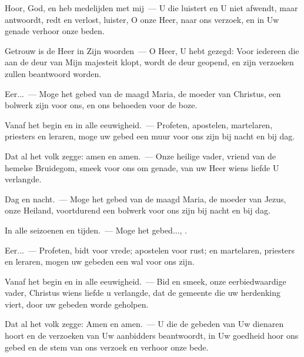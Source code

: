 \documentclass[12pt,twoside,a5paper]{article}
\begin{document}

\begin{halfparskip}
  Hoor, God, en heb medelijden met mij~--- U die luistert en U niet afwendt, maar antwoordt, redt en verlost, luister, O onze Heer, naar ons verzoek, en in Uw genade verhoor onze beden.

  Getrouw is de Heer in Zijn woorden~--- O Heer, U hebt gezegd: Voor iedereen die aan de deur van Mijn majesteit klopt, wordt de deur geopend, en zijn verzoeken zullen beantwoord worden.

  Eer...~--- Moge het gebed van de maagd Maria, de moeder van Christus, een bolwerk zijn voor ons, en ons behoeden voor de boze.

  Vanaf het begin en in alle eeuwigheid.~--- Profeten, apostelen, martelaren, priesters en leraren, moge uw gebed een muur voor ons zijn bij nacht en bij dag.

  Dat al het volk zegge: amen en amen.~--- Onze heilige vader, vriend van de hemelse Bruidegom, smeek voor ons om genade, van uw Heer wiens liefde U verlangde.
\end{halfparskip}


\begin{halfparskip}
  Dag en nacht.~--- Moge het gebed van de maagd Maria, de moeder van Jezus, onze Heiland, voortdurend een bolwerk voor ons zijn bij nacht en bij dag.

  In alle seizoenen en tijden.~--- Moge het gebed..., .

  Eer...~--- Profeten, bidt voor vrede; apostelen voor rust; en martelaren, priesters en leraren, mogen uw gebeden een wal voor ons zijn.

  Vanaf het begin en in alle eeuwigheid.~--- Bid en smeek, onze eerbiedwaardige vader, Christus wiens liefde u verlangde, dat de gemeente die uw herdenking viert, door uw gebeden worde geholpen.

  Dat al het volk zegge: Amen en amen.~--- U die de gebeden van Uw dienaren hoort en de verzoeken van Uw aanbidders beantwoordt, in Uw goedheid hoor ons gebed en de stem van ons verzoek en verhoor onze bede.
\end{halfparskip}

\end{document}
